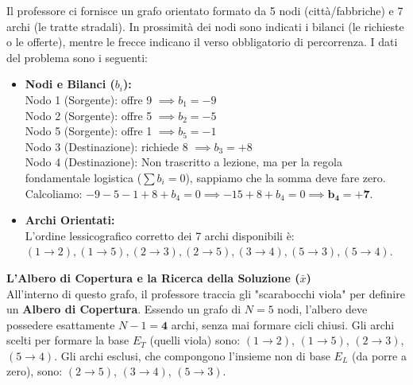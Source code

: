 \documentclass[12pt, a4paper]{article}
\begin{document}
	Il professore ci fornisce un grafo orientato formato da 5 nodi (città/fabbriche) e 7 archi (le tratte stradali). In prossimità dei nodi sono indicati i bilanci (le richieste o le offerte), mentre le frecce indicano il verso obbligatorio di percorrenza.
	I dati del problema sono i seguenti:
	\begin{itemize}[label=\textcolor{titlecolor}{\Large\textbullet}, itemsep=2pt, leftmargin=1.5cm]
		\item \textbf{Nodi e Bilanci ($b_i$):}\\
		Nodo 1 (Sorgente): offre 9 $\implies b_1 = -9$ \\
		Nodo 2 (Sorgente): offre 5 $\implies b_2 = -5$ \\
		Nodo 5 (Sorgente): offre 1 $\implies b_5 = -1$ \\
		Nodo 3 (Destinazione): richiede 8 $\implies b_3 = +8$ \\
		Nodo 4 (Destinazione): Non trascritto a lezione, ma per la regola fondamentale logistica ($\sum b_i = 0$), sappiamo che la somma deve fare zero. Calcoliamo: $-9 - 5 - 1 + 8 + b_4 = 0 \implies -15 + 8 + b_4 = 0 \implies \mathbf{b_4 = +7}$.
		\item \textbf{Archi Orientati:}\\
		L'ordine lessicografico corretto dei 7 archi disponibili è: $(1\to2), (1\to5), (2\to3), (2\to5), (3\to4), (5\to3), (5\to4)$.
	\end{itemize}
	
	\vspace{0.4cm}
	\textbf{L'Albero di Copertura e la Ricerca della Soluzione ($\bar{x}$)}\\
	All'interno di questo grafo, il professore traccia gli "scarabocchi viola" per definire un \textbf{Albero di Copertura}. Essendo un grafo di $N=5$ nodi, l'albero deve possedere esattamente $N-1 = \mathbf{4}$ archi, senza mai formare cicli chiusi. 
	Gli archi scelti per formare la base $E_T$ (quelli viola) sono: $(1\to2)$, $(1\to5)$, $(2\to3)$, $(5\to4)$. 
	Gli archi esclusi, che compongono l'insieme non di base $E_L$ (da porre a zero), sono: $(2\to5)$, $(3\to4)$, $(5\to3)$.
	
\end{document}
